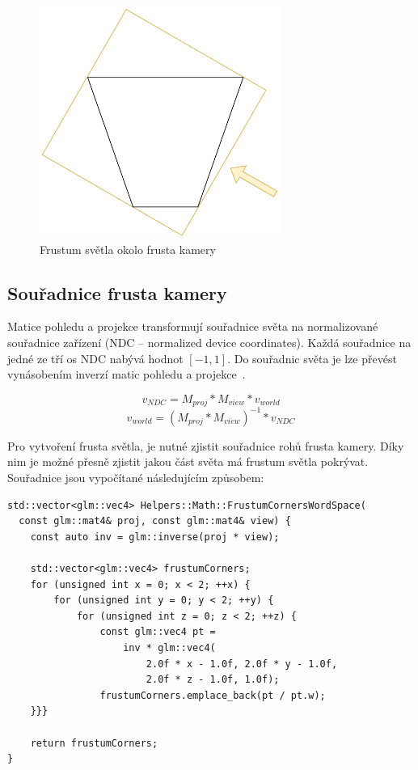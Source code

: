 \documentclass[thesis=M,czech]{FITthesis}[2019/12/23]
\begin{document}
\begin{figure}\centering
	\includegraphics[width=0.7\textwidth]{images/shadows/frustum_fit}
	\caption[Frustum světla okolo frusta kamery]{Frustum světla okolo frusta kamery}\label{fig:shadows_frustum_fit}
\end{figure}

\subsection{Souřadnice frusta kamery}

Matice pohledu a projekce transformují souřadnice světa na normalizované souřadnice zařízení (NDC – normalized device coordinates). Každá souřadnice na jedné ze tří os NDC nabývá hodnot $[-1, 1]$. Do souřadnic světa je lze převést vynásobením inverzí matic pohledu a projekce~\cite{lopgl_csm}.

$$
v_{NDC} = M_{proj} * M_{view} * v_{world}
$$
$$
v_{world} = (M_{proj} * M_{view})^{-1} * v_{NDC}
$$

Pro vytvoření frusta světla, je nutné zjistit souřadnice rohů frusta kamery. Díky nim je možné přesně zjistit jakou část světa má frustum světla pokrývat. Souřadnice jsou vypočítané následujícím způsobem:

\begin{verbatim}
std::vector<glm::vec4> Helpers::Math::FrustumCornersWordSpace(
  const glm::mat4& proj, const glm::mat4& view) {
    const auto inv = glm::inverse(proj * view);

    std::vector<glm::vec4> frustumCorners;
    for (unsigned int x = 0; x < 2; ++x) {
        for (unsigned int y = 0; y < 2; ++y) {
            for (unsigned int z = 0; z < 2; ++z) {
                const glm::vec4 pt =
                    inv * glm::vec4(
                        2.0f * x - 1.0f, 2.0f * y - 1.0f,
                        2.0f * z - 1.0f, 1.0f);
                frustumCorners.emplace_back(pt / pt.w);
    }}}

    return frustumCorners;
}
\end{verbatim}
\end{document}
